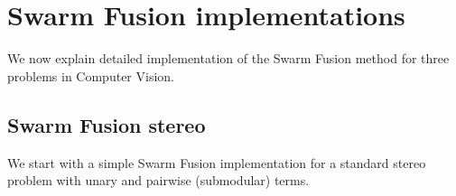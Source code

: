 \section{Swarm Fusion implementations}
We now explain detailed implementation of the Swarm Fusion method for
three problems in Computer Vision.

\subsection{Swarm Fusion stereo}
We start with a simple Swarm Fusion implementation for a standard stereo
problem with unary and pairwise (submodular) terms.

